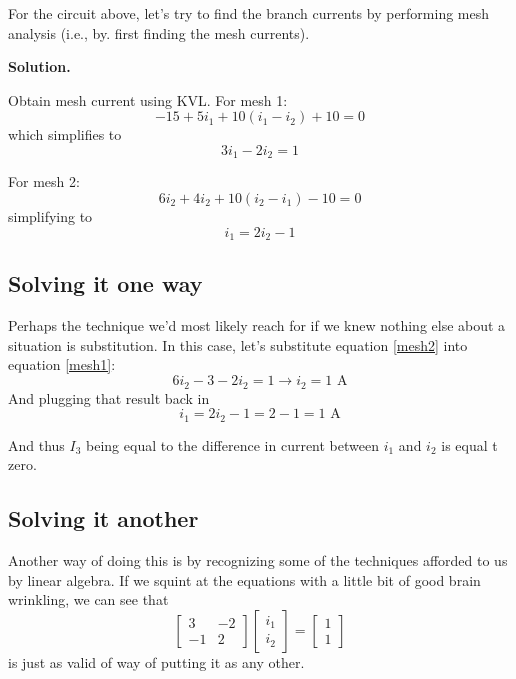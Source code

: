 \documentclass[11pt]{book}
\begin{document}
For the circuit above, let's try to find the branch currents by performing mesh analysis (i.e., by. first finding the mesh currents).

\textbf{Solution.}

Obtain mesh current using KVL. For mesh 1:
\begin{equation}
	-15 + 5 i_1 + 10(i_1 - i_2) + 10 = 0
\end{equation}
which simplifies to 
\begin{equation}
	3i_1 - 2i_2 = 1
	\label{mesh1}
\end{equation}

For  mesh 2:
\begin{equation}
	6i_2 + 4 i_2 + 10(i_2 - i_1) - 10 = 0
\end{equation}
simplifying to
\begin{equation}
	i_1 = 2i_2 - 1
	\label{mesh2}
\end{equation}

\subsection{Solving it one way}
Perhaps the technique we'd most likely reach for if we knew nothing else about a situation is substitution. In this case, let's substitute equation \ref{mesh2} into equation \ref{mesh1}:
\begin{equation}
	6i_2 - 3 - 2i_2 = 1 \rightarrow i_2 = 1 \text{ A}
\end{equation}
And plugging that result back in
\begin{equation}
	i_1 = 2i_2 -1 = 2 - 1 = 1 \text{ A}
\end{equation}

And thus $I_3$ being equal to the difference in current between $i_1$ and $i_2$ is equal t zero.


\subsection{Solving it another}
Another way of doing this is by recognizing some of the techniques afforded to us by linear algebra. If we squint at the equations with a little bit of good brain wrinkling, we can see that 
\begin{equation}
	\begin{bmatrix}
		3 & -2 \\ -1 & 2
	\end{bmatrix}
	\begin{bmatrix}
		i_1 \\ i_2
	\end{bmatrix}
	=
	\begin{bmatrix}
		1 \\ 1
	\end{bmatrix}
\end{equation}
is just as valid of way of putting it as any other.
\end{document}
